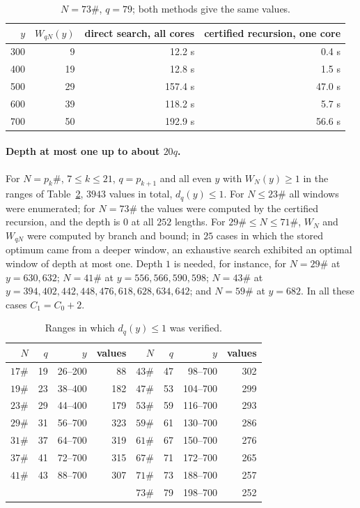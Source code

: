 \documentclass[11pt]{article}
\theoremstyle{definition}
\theoremstyle{remark}
\begin{document}
\begin{table}[ht]
\centering
\begin{tabular}{rrrr}
\toprule
$y$ & $W_{qN}(y)$ & direct search, all cores & certified recursion, one core \\
\midrule
300 & 9 & 12.2 s & 0.4 s \\
400 & 19 & 12.8 s & 1.5 s \\
500 & 29 & 157.4 s & 47.0 s \\
600 & 39 & 118.2 s & 5.7 s \\
700 & 50 & 192.9 s & 56.6 s \\
\bottomrule
\end{tabular}
\caption{$N = 73\#$, $q = 79$; both methods give the same values.}\label{tab:bench}
\end{table}

\paragraph{Depth at most one up to about $20q$.} For $N = p_k\#$, $7 \le k \le 21$, $q = p_{k+1}$ and all even $y$ with $W_N(y) \ge 1$ in the ranges of Table~\ref{tab:depth1}, $3943$ values in total, $d_q(y) \le 1$. For $N \le 23\#$ all windows were enumerated; for $N = 73\#$ the values were computed by the certified recursion, and the depth is $0$ at all $252$ lengths. For $29\# \le N \le 71\#$, $W_N$ and $W_{qN}$ were computed by branch and bound; in $25$ cases in which the stored optimum came from a deeper window, an exhaustive search exhibited an optimal window of depth at most one. Depth $1$ is needed, for instance, for $N = 29\#$ at $y = 630, 632$; $N = 41\#$ at $y = 556, 566, 590, 598$; $N = 43\#$ at $y = 394, 402, 442, 448, 476, 618, 628, 634, 642$; and $N = 59\#$ at $y = 682$. In all these cases $C_1 = C_0 + 2$.

\begin{table}[ht]
\centering
\begin{tabular}{rrrr@{\qquad}rrrr}
\toprule
$N$ & $q$ & $y$ & values & $N$ & $q$ & $y$ & values \\
\midrule
$17\#$ & 19 & 26--200 & 88  & $43\#$ & 47 & 98--700  & 302 \\
$19\#$ & 23 & 38--400 & 182 & $47\#$ & 53 & 104--700 & 299 \\
$23\#$ & 29 & 44--400 & 179 & $53\#$ & 59 & 116--700 & 293 \\
$29\#$ & 31 & 56--700 & 323 & $59\#$ & 61 & 130--700 & 286 \\
$31\#$ & 37 & 64--700 & 319 & $61\#$ & 67 & 150--700 & 276 \\
$37\#$ & 41 & 72--700 & 315 & $67\#$ & 71 & 172--700 & 265 \\
$41\#$ & 43 & 88--700 & 307 & $71\#$ & 73 & 188--700 & 257 \\
 & & & & $73\#$ & 79 & 198--700 & 252 \\
\bottomrule
\end{tabular}
\caption{Ranges in which $d_q(y) \le 1$ was verified.}\label{tab:depth1}
\end{table}
\end{document}

